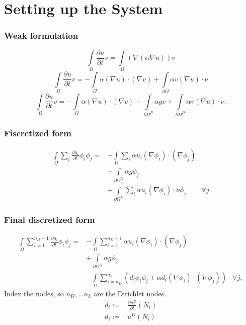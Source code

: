 \section{Setting up the System}

\begin{frame}
\frametitle{Weak formulation}
\begin{equation*}
        \int\limits_{\Omega} \frac{\partial u}{\partial t} v = \int\limits_{\Omega} (\nabla(\alpha\nabla u)) v
\end{equation*}
\begin{equation*}
        \int\limits_{\Omega} \frac{\partial u}{\partial t} v = -\int\limits_{\Omega} \alpha(\nabla u) \cdot (\nabla v) + \int\limits_{\partial \Omega} \alpha v (\nabla u) \cdot \nu
\end{equation*}
\begin{equation*}
        \label{eqn::weakForm}
        \int\limits_{\Omega} \frac{\partial u}{\partial t} v = -\int\limits_{\Omega} \alpha(\nabla u) \cdot (\nabla v) +  \int\limits_{\partial\Omega^N} \alpha gv + \int\limits_{\partial \Omega^D} \alpha v (\nabla u) \cdot \nu.
\end{equation*}
\end{frame}

\begin{frame}
\frametitle{Fiscretized form}
\begin{equation*}
\begin{aligned}
        \int\limits_{\Omega} \sum_i \frac{\partial u_i}{\partial t} \phi_i \phi_j = &-\int\limits_{\Omega} \sum_i \alpha u_i(\nabla \phi_i) \cdot (\nabla \phi_j) \\
        &+ \int\limits_{\partial\Omega^N} \alpha g\phi_j \\
        &+ \int\limits_{\partial\Omega^D} \sum_i \alpha u_i (\nabla \phi_i) \cdot \nu \phi_j & \forall j
\end{aligned}
\end{equation*}
\end{frame}

\begin{frame}
\frametitle{Final discretized form}
\begin{align*}
        \int\limits_{\Omega} \sum_{i=1}^{n_D-1} \frac{\partial u_i}{\partial t} \phi_i \phi_j = &-\int\limits_{\Omega} \sum_{i=1}^{n_D-1} \alpha u_i(\nabla \phi_i) \cdot (\nabla \phi_j) \\
        &+ \int\limits_{\partial\Omega^N} \alpha g\phi_j \\
        &-        \int\limits_{\Omega} \sum_{i=n_D}^{n_h}\left( \dot{d}_i \phi_i \phi_j  + \alpha d_i(\nabla \phi_i) \cdot (\nabla \phi_j)\right)
         & \forall j,
\end{align*}
Index the nodes, so $n_D,\dots n_h$ are the Dirichlet nodes.\\
\begin{align*}
	\dot{d}_i:=&\frac{\partial u^D}{\partial t}(N_i)\\
	d_i:=&u^D(N_i)
\end{align*}
\end{frame}

